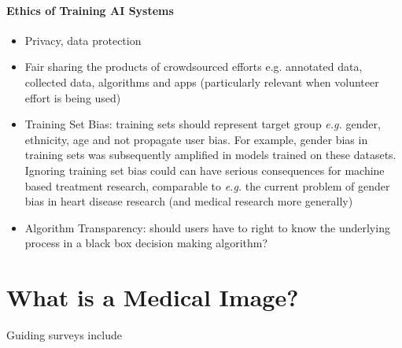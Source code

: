\documentclass[10pt,twocolumn,letterpaper]{article}
\begin{document}
\paragraph{Ethics of Training AI Systems}
\begin{itemize}

\item Privacy, data protection

\item Fair sharing the products of crowdsourced efforts e.g. annotated data, collected data, algorithms and apps (particularly relevant when volunteer effort is being used)

\item Training Set Bias: training sets should represent target group \textit{e.g.} gender, ethnicity, age and not propagate user bias. For example, gender bias in training sets \cite{zhao2017trainingsetbiastext, hendricks2018trainingbiasimage} was subsequently amplified in models trained on these datasets. Ignoring training set bias could can have serious consequences for machine based treatment research, comparable to \textit{e.g.} the current problem of gender bias in heart disease research (and medical research more generally)

\item Algorithm Transparency: should users have to right to know the underlying process in a black box decision making algorithm\cite{olhede2017fairness}?

\end{itemize}

\section{What is a Medical Image?}
Guiding surveys include \cite{litjens2017survey} %
\end{document}
